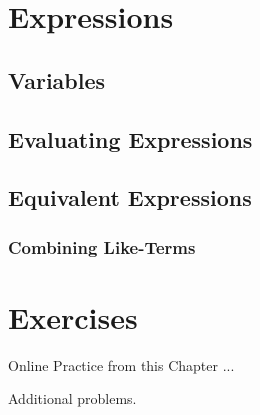 \newpage 
\section{Expressions}

\subsection{Variables}
\subsection{Evaluating Expressions}
\subsection{Equivalent Expressions}
\subsubsection{Combining Like-Terms}

\newpage 
\section{Exercises} 

Online Practice from this Chapter ... 

Additional problems. 
















